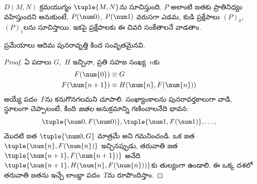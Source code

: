 \documentclass[../../../include/open-logic-section]{subfiles}
\begin{document}
$D(M,N)$ క్రమయుగ్మం $\tuple{M, N}$ను సూచిస్తుంది.
$P$ అలాంటి జతకు ప్రాతినిధ్యం వహిస్తుందని అనుకుంటే, $P(\num 0)$,
$P(\num 1)$ వరుసగా ఎడమ, కుడి ప్రక్షేపాలు $(P)_0$, $(P)_1$లను
సూచిస్తాయి. ఇకపై ప్రక్షేపాలకు ఈ చివరి సంకేతాలనే వాడతాం.

\begin{lem}
 ప్రమేయాలు ఆదిమ పునరావృత్తి కింద సంవృతమైనవి.
\end{lem}

\begin{proof}
ఏ పదాలు $G$,~$H$ ఇచ్చినా, ప్రతి సహజ సంఖ్య~$n$కు
\begin{align*}
F(\num{0}) & \equiv G \\
F(\num{n+1}) & \equiv H(\num{n}, F(\num{n}))
\end{align*}
అయ్యే పదం~$F$ను కనుగొనగలమని చూపాలి. సంఖ్యాంకాలను పునరావర్తకాలుగా
వాడి, స్థూలంగా చెప్పాలంటే, కింది
\emph{జతల} అనుక్రమాన్ని గణించాలనేది భావన:
\[
\tuple{\num 0, F(\num 0)}, \tuple{\num 1, F(\num 1)}, \dots,
\]
మొదటి జత $\tuple{\num 0, G}$ మాత్రమే అని గమనించండి. ఒక జత
$\tuple{\num{n}, F(\num{n})}$ ఇచ్చినప్పుడు, తరువాతి జత
$\tuple{\num{n+1}, F(\num{n+1})}$ అనేది
$\tuple{\num{n+1}, H(\num{n}, F(\num{n}))}$కు తుల్యంగా ఉండాలి.
ఈ ఒక్క దశలో తరువాతి జతను ఇచ్చే లాంబ్డా పదం~$T$ను రూపొందిస్తాం.


\end{proof}
\end{document}
